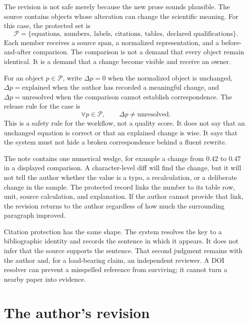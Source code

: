 The revision is not safe merely because the new prose sounds plausible. The
source contains objects whose alteration can change the scientific meaning.
For this case, the protected set is
\begin{equation}
  \mathcal P = \{\text{equations},\ \text{numbers},\ \text{labels},\
  \text{citations},\ \text{tables},\ \text{declared qualifications}\}.
  \label{eq:case-protected-set}
\end{equation}
Each member receives a source span, a normalized representation, and a
before-and-after comparison. The comparison is not a demand that every object
remain identical. It is a demand that a change become visible and receive an
owner.

For an object $p\in\mathcal P$, write $\Delta p=0$ when the normalized object
is unchanged, $\Delta p=\mathrm{explained}$ when the author has recorded a
meaningful change, and $\Delta p=\mathrm{unresolved}$ when the comparison
cannot establish correspondence. The release rule for the case is
\begin{equation}
  \forall p\in\mathcal P,\qquad
  \Delta p \ne \mathrm{unresolved}.
  \label{eq:case-protection-rule}
\end{equation}
This is a safety rule for the workflow, not a quality score. It does not say
that an unchanged equation is correct or that an explained change is wise. It
says that the system must not hide a broken correspondence behind a fluent
rewrite.

The note contains one numerical wedge, for example a change from $0.42$ to
$0.47$ in a displayed comparison. A character-level diff will find the change,
but it will not tell the author whether the value is a typo, a recalculation,
or a deliberate change in the sample. The protected record links the number to
its table row, unit, source calculation, and explanation. If the author cannot
provide that link, the revision returns to the author regardless of how much
the surrounding paragraph improved.

Citation protection has the same shape. The system resolves the key to a
bibliographic identity and records the sentence in which it appears. It does
not infer that the source supports the sentence. That second judgment remains
with the author and, for a load-bearing claim, an independent reviewer. A DOI
resolver can prevent a misspelled reference from surviving; it cannot turn a
nearby paper into evidence.

\section{The author's revision}
\label{sec:case-author-loop}

